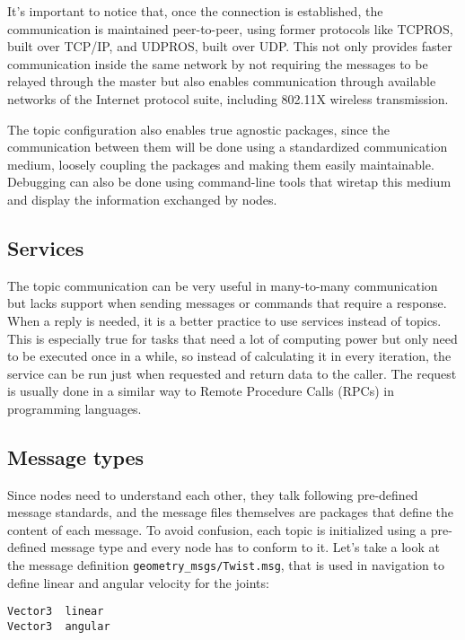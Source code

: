 It's important to notice that, once the connection is established, the communication is maintained peer-to-peer, using former protocols like TCPROS, built over TCP/IP, and UDPROS, built over UDP. This not only provides faster communication inside the same network by not requiring the messages to be relayed through the master but also enables communication through available networks of the Internet protocol suite, including 802.11X wireless transmission.

The topic configuration also enables true agnostic packages, since the communication between them will be done using a standardized communication medium, loosely coupling the packages and making them easily maintainable. Debugging can also be done using command-line tools that wiretap this medium and display the information exchanged by nodes.

\subsection{Services}

The topic communication can be very useful in many-to-many communication but lacks support when sending messages or commands that require a response. When a reply is needed, it is a better practice to use services instead of topics. This is especially true for tasks that need a lot of computing power but only need to be executed once in a while, so instead of calculating it in every iteration, the service can be run just when requested and return data to the caller. The request is usually done in a similar way to Remote Procedure Calls (RPCs) in programming languages.

\subsection{Message types}

Since nodes need to understand each other, they talk following pre-defined message standards, and the message files themselves are packages that define the content of each message. To avoid confusion, each topic is initialized using a pre-defined message type and every node has to conform to it. Let's take a look at the message definition \texttt{geometry\_msgs/Twist.msg}, that is used in navigation to define linear and angular velocity for the joints:

\begin{lstlisting}
Vector3  linear
Vector3  angular
\end{lstlisting}

